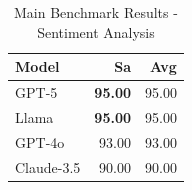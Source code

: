 \begin{table}[htbp]
\centering
\caption{Main Benchmark Results - Sentiment Analysis}
\label{tab:sa_main_results}
\begin{tabular}{lrr}
\toprule
Model & Sa & \textbf{Avg} \\
\midrule
GPT-5 & \textbf{95.00} & 95.00 \\
Llama & \textbf{95.00} & 95.00 \\
GPT-4o & 93.00 & 93.00 \\
Claude-3.5 & 90.00 & 90.00 \\
\bottomrule
\end{tabular}
\end{table}
